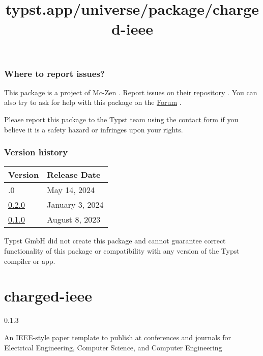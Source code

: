 \subsubsection{Where to report issues?}\label{where-to-report-issues}

This package is a project of Mc-Zen . Report issues on
\href{https://github.com/Mc-Zen/tidy}{their repository} . You can also
try to ask for help with this package on the
\href{https://forum.typst.app}{Forum} .

Please report this package to the Typst team using the
\href{https://typst.app/contact}{contact form} if you believe it is a
safety hazard or infringes upon your rights.

\label{versions}
\subsubsection{Version history}\label{version-history}

\begin{longtable}[]{@{}ll@{}}
\toprule\noalign{}
Version & Release Date \\
\midrule\noalign{}
\endhead
\bottomrule\noalign{}
\endlastfoot
0.3.0 & May 14, 2024 \\
\href{https://typst.app/universe/package/tidy/0.2.0/}{0.2.0} & January
3, 2024 \\
\href{https://typst.app/universe/package/tidy/0.1.0/}{0.1.0} & August 8,
2023 \\
\end{longtable}

Typst GmbH did not create this package and cannot guarantee correct
functionality of this package or compatibility with any version of the
Typst compiler or app.


\title{typst.app/universe/package/charged-ieee}

\label{banner}
\label{template-thumbnail}

\section{charged-ieee}\label{charged-ieee}

{ 0.1.3 }

An IEEE-style paper template to publish at conferences and journals for
Electrical Engineering, Computer Science, and Computer Engineering

